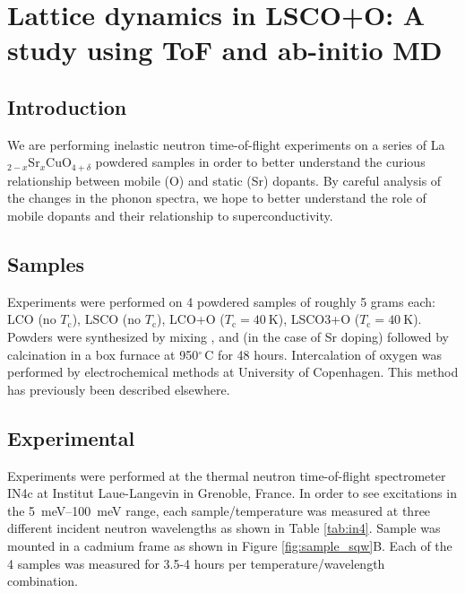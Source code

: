 \chapter{Lattice dynamics in LSCO+O: A study using ToF and ab-initio MD}

\section{Introduction}
We are performing inelastic neutron time-of-flight experiments on a series of La$_{2-x}$Sr$_{x}$CuO$_{4+\delta}$ powdered samples in order to better understand the curious relationship between mobile (O) and static (Sr) dopants. By careful analysis of the changes in the phonon spectra, we hope to better understand the role of mobile dopants and their relationship to superconductivity.

\section{Samples}
Experiments were performed on 4 powdered samples of roughly 5 grams each: LCO (no $T_\text{c}$), LSCO (no $T_\text{c}$), LCO+O ($T_\text{c} = \SI{40}{\kelvin}$), LSCO3+O ($T_\text{c} = \SI{40}{\kelvin}$). Powders were synthesized by mixing ,  and (in the case of Sr doping)  followed by calcination in a box furnace at 950$^\circ \, \text{C}$ for 48 hours. Intercalation of oxygen was performed by electrochemical methods at University of Copenhagen. This method has previously been described elsewhere\cite{Blakeslee1998}.

\section{Experimental}
Experiments were performed at the thermal neutron time-of-flight spectrometer IN4c at Institut Laue-Langevin in Grenoble, France. In order to see excitations in the \SIrange{5}{100}{\milli\eV} range, each sample/temperature was measured at three different incident neutron wavelengths as shown in Table \ref{tab:in4}. Sample was mounted in a cadmium frame as shown in Figure \ref{fig:sample_sqw}B. Each of the 4 samples was measured for 3.5-4 hours per temperature/wavelength combination. 


